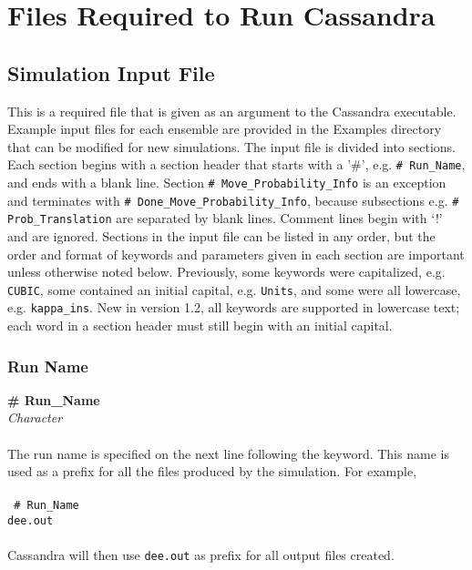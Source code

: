 \chapter{Files Required to Run Cassandra}
\label{ch:input_files}

\section{Simulation Input File} \label{sec:Input_File}
This is a required file that is given as an argument to the Cassandra executable. 
Example input files for each ensemble are provided in the Examples directory that can be
modified for new simulations.
The input file is divided into sections. 
Each section begins with a section header that starts with a '\#', 
e.g. {\tt\# Run\_Name}, and ends with a blank line.
Section {\tt\# Move\_Probability\_Info} is an exception and terminates with
{\tt\# Done\_Move\_Probability\_Info}, because subsections
e.g. {\tt\# Prob\_Translation} are separated by blank lines.
Comment lines begin with `!' and are ignored. 
Sections in the input file can be listed in any order, 
but the order and format of keywords and parameters given in each section 
are important unless otherwise noted below.
Previously, some keywords were capitalized, e.g. {\tt CUBIC}, 
some contained an initial capital, e.g. {\tt Units}, 
and some were all lowercase, e.g. {\tt kappa\_ins}.
New in version 1.2, all keywords are supported in lowercase text; 
each word in a section header must still begin with an initial capital.
%
%
%
\subsection{Run Name}\label{sec:Run_Name}
{\bf \# Run\_Name}\\
{\it Character} \\ \\
%
The run name is specified on the next line following the keyword. This name is used as a prefix for all the files
produced by the simulation. For example,\\ \\
%
{\tt{
\# Run\_Name \\
dee.out
}} \\ \\
%
Cassandra will then use \texttt{dee.out} as prefix for all output files created.

